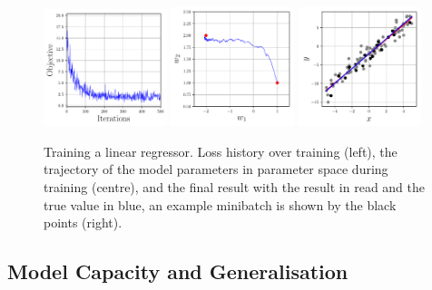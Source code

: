 \begin{figure}[h!]
    \begin{center}
        \includegraphics[width=0.32\textwidth]{figures/machine_learning/loss_history.pdf}
        \includegraphics[width=0.32\textwidth]{figures/machine_learning/w1_w2_history.pdf}
        \includegraphics[width=0.32\textwidth]{figures/machine_learning/data_and_results.pdf}
    \end{center}
    \caption{Training a linear regressor. Loss history over training (left), the trajectory of the model parameters in parameter space during training (centre), and the final result with the result in read and the true value in blue, an example minibatch is shown by the black points (right).}
        \label{fig:machine_learning:lin_example}
\end{figure}








\subsection{Model Capacity and Generalisation}

